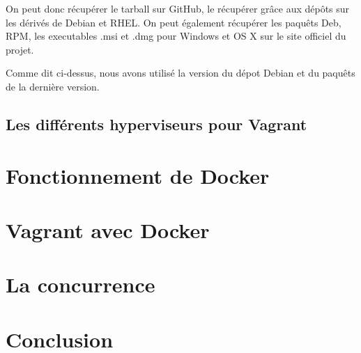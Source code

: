 \documentclass[12pt,a4paper]{article}
\begin{document}
On peut donc récupérer le tarball sur GitHub, le récupérer grâce aux dépôts sur les dérivés de Debian et RHEL. On peut également récupérer les paquêts Deb, RPM, les executables .msi et .dmg pour Windows et OS X sur le site officiel du projet.

Comme dit ci-dessus, nous avons utilisé la version du dépot Debian et du paquêts de la dernière version.



\subsection{Les différents hyperviseurs pour Vagrant}

\section{Fonctionnement de Docker}

\section{Vagrant avec Docker}

\section{La concurrence}

\section{Conclusion}
\end{document}
